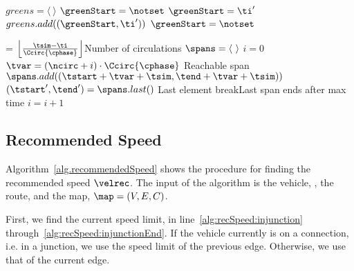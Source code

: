 \begin{algorithm}
\caption{$getSpans(\con, \ti)$}\label{alg.getSpans}
\begin{algorithmic}[1]
\State $greens = \langle\ \rangle$\label{alg:getSpans:initGreens}
\State $\greenStart = \notset$\label{alg:getSpans:initgreenS}
\label{alg:getSpans:GreensFor}
\label{alg:getSpans:GreenBegin}
\State $\greenStart = \ti'$\label{alg:getSpans:storet}
\label{alg:getSpans:GreenEnd}
\State $greens.add((\greenStart, \ti'))$\label{alg:getSpans:addGreens}
\State $\greenStart=\notset$\label{alg:getSpans:resetnotset}
\EndIf
\EndFor\label{alg:getSpans:GreensEnd}

\State \ncirc = $\left \lfloor \frac{\tsim-\ti}{\Ccirc{\cphase}} \right \rfloor$\Comment Number of circulations\label{alg:getSpans:ncirc}
\State $\spans = \langle\ \rangle$\label{alg:getSpans:initSpans}
\State $i = 0$\label{alg:getSpans:i}
\label{alg:getSpans:whilebegin}
\label{alg:getSpans:forbegin}
\State $\tvar = (\ncirc+i)\cdot \Ccirc{\cphase}$\label{alg:getSpans:tvar}
\If {$\tend+\tvar> \tsim-\ti$}\Comment Reachable span\label{alg:getSpans:ifReachable}
\State $\spans.add((\tstart + \tvar+\tsim, \tend + \tvar+ \tsim))$\label{alg:getSpans:add}
\EndIf
\EndFor
\State $(\tstart',\tend') = \spans.last()$ \Comment Last element\label{alg:getSpans:last}
\label{alg:getSpans:breakCond}
\State break\Comment Last span ends after max time
\EndIf
\State $i=i+1$\label{alg:getSpans:i++}
\EndWhile\label{alg:getSpans:endWhile}
\State\Return \spans
\end{algorithmic}
\end{algorithm}



\subsection{Recommended Speed}
Algorithm~\ref{alg.recommendedSpeed} shows the procedure for finding the recommended speed $\velrec$.
The input of the algorithm is the vehicle, \veh, the route, \route and the map, $\map = (V, E, C)$.

First, we find the current speed limit, \velmax in line~\ref{alg:recSpeed:injunction} through~\ref{alg:recSpeed:injunctionEnd}. %
If the vehicle currently is on a connection, i.e. in a junction, we use the speed limit of the previous edge.
Otherwise, we use that of the current edge.

